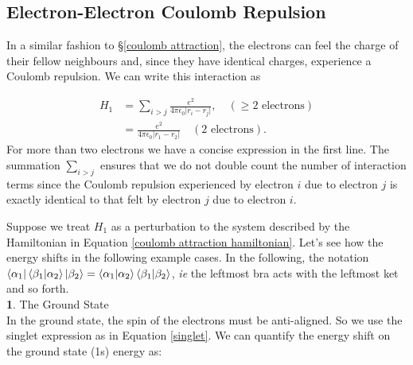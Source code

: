 \documentclass{article}
\numberwithin{equation}{section} %
\begin{document}
\subsection{Electron-Electron Coulomb Repulsion}

In a similar fashion to \S\ref{coulomb attraction}, the electrons can feel the charge of their fellow neighbours and, since they have identical charges, experience a Coulomb repulsion. We can write this interaction as

\begin{equation}
\begin{split}
H_1&=\sum_{i>j} \frac{e^2}{4\pi\epsilon_0\vert r_i-r_j\vert}, \quad (\geq \text{2 electrons})\\
&= \frac{e^2}{4\pi\epsilon_0\vert r_1-r_2\vert} \quad (\text{2 electrons}).
\end{split}
\end{equation}
For more than two electrons we have a concise expression in the first line. The summation $\sum_{i>j}$ ensures that we do not double count the number of interaction terms since the Coulomb repulsion experienced by electron $i$ due to electron $j$ is exactly identical to that felt by electron $j$ due to electron $i$.

Suppose we treat $H_1$ as a perturbation to the system described by the Hamiltonian in Equation \ref{coulomb attraction hamiltonian}. Let's see how the energy shifts in the following example cases. In the following, the notation $\bra{\alpha_1}\bra{\beta_1} \ket{\alpha_2}\ket{\beta_2} = \bra{\alpha_1}\ket{\alpha_2}\bra{\beta_1}\ket{\beta_2}$, \textit{ie} the leftmost bra acts with the leftmost ket and so forth.\\

\noindent\textbf{1}. The Ground State\\

In the ground state, the spin of the electrons must be anti-aligned. So we use the singlet expression as in Equation \ref{singlet}. We can quantify the energy shift on the ground state (1s) energy as:
\end{document}
